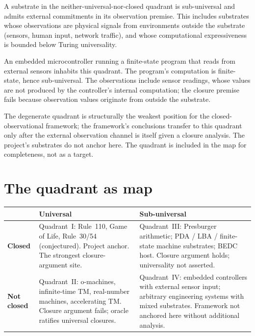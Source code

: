 \begin{definition}
\label{def:quadrant-degenerate-substrate}
A substrate in the neither-universal-nor-closed quadrant is sub-universal and admits external commitments in its observation premise. This includes substrates whose observations are physical signals from environments outside the substrate (sensors, human input, network traffic), and whose computational expressiveness is bounded below Turing universality.
\end{definition}

\begin{example}
\label{ex:quadrant-embedded-controller}
An embedded microcontroller running a finite-state program that reads from external sensors inhabits this quadrant. The program's computation is finite-state, hence sub-universal. The observations include sensor readings, whose values are not produced by the controller's internal computation; the closure premise fails because observation values originate from outside the substrate.
\end{example}

\begin{remark}
\label{rem:quadrant-degenerate-not-anchor}
The degenerate quadrant is structurally the weakest position for the closed-observational framework; the framework's conclusions transfer to this quadrant only after the external observation channel is itself given a closure analysis. The project's substrates do not anchor here. The quadrant is included in the map for completeness, not as a target.
\end{remark}

\section{The quadrant as map}
\label{sec:quadrant-as-map}

\begin{longtable}{p{}p{}p{}}
\toprule
& \textbf{Universal} & \textbf{Sub-universal} \\
\midrule
\textbf{Closed} &
Quadrant~I: Rule~110, Game of Life, Rule~30/54 (conjectured). Project anchor. The strongest closure-argument site.
&
Quadrant~III: Presburger arithmetic; PDA / LBA / finite-state machine substrates; BEDC host. Closure argument holds; universality not asserted. \\
\midrule
\textbf{Not closed} &
Quadrant~II: o-machines, infinite-time TM, real-number machines, accelerating TM. Closure argument fails; oracle ratifies universal closures.
&
Quadrant~IV: embedded controllers with external sensor input; arbitrary engineering systems with mixed substrates. Framework not anchored here without additional analysis. \\
\bottomrule
\end{longtable}

